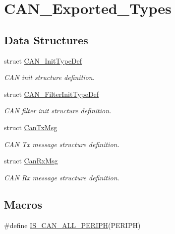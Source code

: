 \hypertarget{group___c_a_n___exported___types}{}\section{C\+A\+N\+\_\+\+Exported\+\_\+\+Types}
\label{group___c_a_n___exported___types}
\subsection*{Data Structures}
\begin{DoxyCompactItemize}
\item 
struct \mbox{\hyperlink{struct_c_a_n___init_type_def}{C\+A\+N\+\_\+\+Init\+Type\+Def}}
\begin{DoxyCompactList}\small\item\em C\+AN init structure definition. \end{DoxyCompactList}\item 
struct \mbox{\hyperlink{struct_c_a_n___filter_init_type_def}{C\+A\+N\+\_\+\+Filter\+Init\+Type\+Def}}
\begin{DoxyCompactList}\small\item\em C\+AN filter init structure definition. \end{DoxyCompactList}\item 
struct \mbox{\hyperlink{struct_can_tx_msg}{Can\+Tx\+Msg}}
\begin{DoxyCompactList}\small\item\em C\+AN Tx message structure definition. \end{DoxyCompactList}\item 
struct \mbox{\hyperlink{struct_can_rx_msg}{Can\+Rx\+Msg}}
\begin{DoxyCompactList}\small\item\em C\+AN Rx message structure definition. \end{DoxyCompactList}\end{DoxyCompactItemize}
\subsection*{Macros}
\begin{DoxyCompactItemize}
\item 
\#define \mbox{\hyperlink{group___c_a_n___exported___types_gaf471a53f52a02078ffd842658d932f63}{I\+S\+\_\+\+C\+A\+N\+\_\+\+A\+L\+L\+\_\+\+P\+E\+R\+I\+PH}}(P\+E\+R\+I\+PH)
\end{DoxyCompactItemize}


